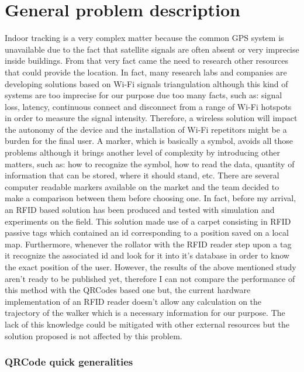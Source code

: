 \chapter{General problem description}

Indoor tracking is a very complex matter because the common GPS system is unavailable due to the fact that satellite signals are often absent or very imprecise inside buildings. From that very fact came the need to research other resources that could provide the location. In fact, many research labs and companies are developing solutions based on Wi-Fi signals triangulation although this kind of systems are too imprecise for our purpose due too many facts, such as: signal loss, latency, continuous connect and disconnect from a range of Wi-Fi hotspots in order to measure the signal intensity.
Therefore, a wireless solution will impact the autonomy of the device and the installation of Wi-Fi repetitors might be a burden for the final user.
A marker, which is basically a symbol, avoids all those problems although it brings another level of complexity by introducing other matters, such as: how to recognize the symbol, how to read the data, quantity of information that can be stored, where it should stand, etc.
There are several computer readable markers available on the market and the team decided to make a comparison between them before choosing one.
In fact, before my arrival, an RFID based solution has been produced and tested with simulation and experiments on the field.
This solution made use of a carpet consisting in RFID passive tags which contained an id corresponding to a position saved on a local map. Furthermore, whenever the rollator with the RFID reader step upon a tag it recognize the associated id and look for it into it's database in order to know the exact position of the user. However, the results of the above mentioned study aren't ready to be published yet, therefore I can not compare the performance of this method with the QRCodes based one but, the current hardware implementation of an RFID reader doesn't allow any calculation on the trajectory of the walker which is a necessary information for our purpose.
The lack of this knowledge could be mitigated with other external resources but the solution proposed is not affected by this problem. 


\subsection{QRCode quick generalities}


